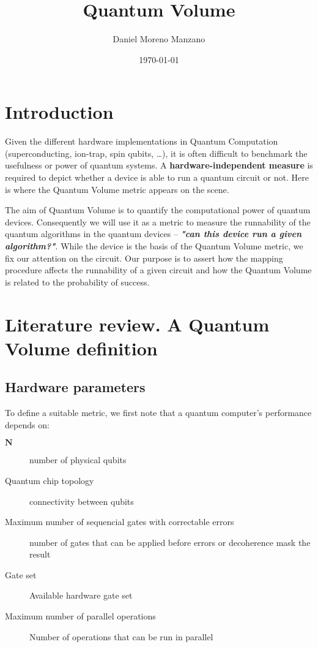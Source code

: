 \documentclass[11pt]{article}
\author{Daniel Moreno Manzano}
\date{\today}
\title{Quantum Volume}
\begin{document}
\maketitle


\section{Introduction}
\label{sec:org94a11b7}

Given the different hardware implementations in Quantum Computation (superconducting, ion-trap, spin qubits, \ldots{}), it is often difficult to benchmark the usefulness or power of quantum systems. 
A \textbf{hardware-independent measure} is required to depict whether a device is able to run a quantum circuit or not.
Here is where the Quantum Volume metric appears on the scene.

The aim of Quantum Volume is to quantify the computational power of quantum devices. 
Consequently we will use it as a metric to measure the runnability of the quantum algorithms in the quantum devices -- \emph{\textbf{"can this device run a given algorithm?"}}.
While the device is the basis of the Quantum Volume metric, we fix our attention on the circuit.
Our purpose is to assert how the mapping procedure affects the runnability of a given circuit and how the Quantum Volume is related to the probability of success.


\section{Literature review. A Quantum Volume definition}
\label{sec:org712c084}

\subsection{Hardware parameters}
\label{sec:org33569a4}

To define a suitable metric, we first note that a quantum computer's performance depends on:

\begin{description}
\item[{\(\textbf{N}\)}] number of physical qubits
\item[{Quantum chip topology}] connectivity between qubits
\item[{Maximum number of sequencial gates with correctable errors}] number of gates that can be applied before errors or decoherence mask the result
\item[{Gate set}] Available hardware gate set
\item[{Maximum number of parallel operations}] Number of operations that can be run in parallel
\end{description}
\end{document}
